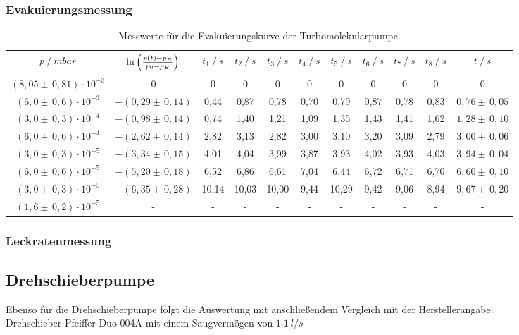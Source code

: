 \subsubsection{Evakuierungsmessung}
\begin{table}[H]
\tiny
\centering
\label{tab:EvakuierungskurveTurbo}
\begin{tabular}{c|c|c|c|c|c|c|c|c|c|c}
{$p \:/\: \si{mbar}$} & {$\ln{\Bigl( \frac{p(t)-p_E}{p_0-p_E}\Bigr)}$} & {$t_1 \:/\: \si{s} $} & {$t_2 \:/\: \si{s}$} & {$t_3 \:/\: \si{s}$} & {$t_4 \:/\: \si{s}$} & {$t_5 \:/\: \si{s}$} & {$t_6 \:/\: \si{s}$}& {$t_7 \:/\: \si{s}$} & {$t_8 \:/\: \si{s}$} & {$\bar{t} \:/\: \si{s}$}\\
\midrule
$(8,05 \pm \, 0,81)\cdot 10^{-3}$ & 0 & 0 &  0 & 0 & 0 & 0 & 0 & 0 & 0 & 0\\
$(6,0 \pm \, 0,6)\cdot 10^{-3}$ & $-(0,29 \pm \, 0,14)$ & 0,44 & 0,87 & 0,78 & 0,70 & 0,79 & 0,87 & 0,78 & 0,83 & $0,76 \pm \, 0,05$\\
$(3,0 \pm \, 0,3)\cdot 10^{-4}$ & $-(0,98 \pm \, 0,14)$ & 0,74 & 1,40 & 1,21 & 1,09 & 1,35 & 1,43 & 1,41 & 1,62 & $1,28 \pm \, 0,10$\\
$(6,0 \pm \, 0,6)\cdot 10^{-4}$ & $-(2,62 \pm \, 0,14)$ & 2,82 & 3,13 & 2,82 & 3,00 & 3,10 & 3,20 & 3,09 & 2,79 & $3,00 \pm \, 0,06$\\
$(3,0 \pm \, 0,3)\cdot 10^{-5}$ & $-(3,34 \pm \, 0,15)$ & 4,01 & 4,04 & 3,99 & 3,87 & 3,93 & 4,02 & 3,93 & 4,03 & $3,94 \pm \, 0,04$\\
$(6,0 \pm \, 0,6)\cdot 10^{-5}$ & $-(5,20 \pm \, 0,18)$ & 6,52 & 6,86 & 6,61 & 7,04 & 6,44 & 6,72 & 6,71 & 6,70 & $6,60 \pm \, 0,10$\\
$(3,0 \pm \, 0,3)\cdot 10^{-5}$ & $-(6,35 \pm \, 0,28)$ & 10,14 & 10,03 & 10,00 & 9,44 & 10,29 & 9,42 & 9,06 & 8,94 & $9,67 \pm \, 0,20$\\
$(1,6 \pm \, 0,2)\cdot 10^{-5}$& - & - &  -& -& -& -& -& -& -& - \\
\end{tabular}
\caption{Messwerte für die Evakuierungskurve der Turbomolekularpumpe.}
\end{table}

\subsubsection{Leckratenmessung}
\subsection{Drehschieberpumpe}
Ebenso für die Drehschieberpumpe folgt die Auswertung mit anschließendem Vergleich mit der
Herstellerangabe:\\
Drehschieber Pfeiffer Duo 004A mit einem Saugvermögen von $\SI{1,1}{l/s}$
